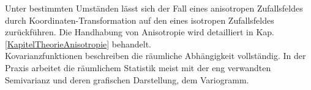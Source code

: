 Unter bestimmten Umständen lässt sich der Fall eines anisotropen
Zufallsfeldes durch Koordinaten-Transformation auf den eines 
isotropen Zufallsfeldes zurückführen. Die Handhabung von Anisotropie wird detailliert in Kap.\,\ref{KapitelTheorieAnisotropie} behandelt.\\

Kovarianzfunktionen beschreiben die räumliche Abhängigkeit vollständig.
In der Praxis arbeitet die räumlichem Statistik meist mit der eng 
verwandten Semivarianz und deren grafischen Darstellung, dem Variogramm.  